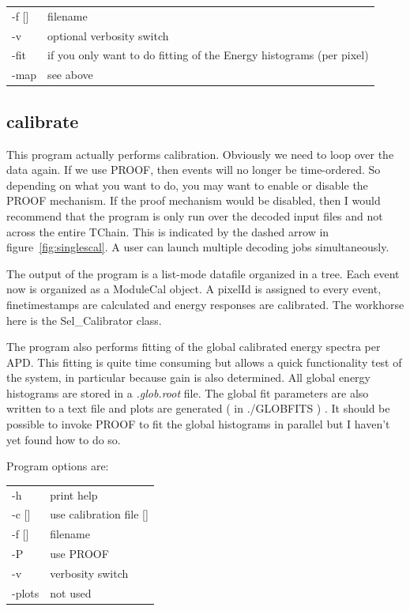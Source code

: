 \documentclass[12pt]{article}
\begin{document}
\begin{tabular}{ll}
-f []& filename\\
-v & optional verbosity switch\\
-fit & if you only want to do fitting of the Energy histograms (per pixel)\\
-map & see above\\
\end{tabular}

\subsection{calibrate}
This program actually performs calibration. Obviously we need to loop over the data again. If we use PROOF, then events will no longer be time-ordered. So depending on what you want to do, you may want to enable or disable the PROOF mechanism. If the proof mechanism would be disabled, then I would recommend that the program is only run over the decoded input files and not across the entire TChain. This is indicated by the dashed arrow in figure~\ref{fig:singlescal}. A user can launch multiple decoding jobs simultaneously. 

The output of the program is a list-mode datafile organized in a tree. Each event now is organized as a  ModuleCal object. A pixelId is assigned to every event, finetimestamps are calculated and energy responses are calibrated. The workhorse here is the Sel\_Calibrator class. 

The program also performs fitting of the global calibrated energy spectra per APD. This fitting is quite time consuming but allows a quick functionality test of the system, in particular because gain is also determined. All global energy histograms are stored in a {\em *.glob.root} file. The global fit parameters are also written to a text file and plots are generated ( in ./GLOBFITS ) . It should be possible to invoke PROOF to fit the global histograms in parallel but I haven't yet found how to do so. 

Program options are:\\
\begin{tabular}{ll}
-h & print help\\
-c []& use calibration file [] \\
-f []& filename \\
-P & use PROOF\\
-v & verbosity switch\\
-plots & not used\\
\end{tabular}
\end{document}
